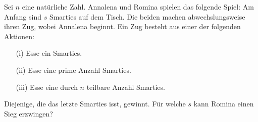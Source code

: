 Sei $n$ eine natürliche Zahl. Annalena und Romina spielen das folgende Spiel:
Am Anfang sind $s$ Smarties auf dem Tisch. Die beiden machen abwechslungsweise ihren Zug, wobei Annalena beginnt. Ein Zug besteht aus einer der folgenden Aktionen:
\begin{itemize}
\item[(i)] Esse ein Smarties.
\item[(ii)] Esse eine prime Anzahl Smarties.
\item[(iii)] Esse eine durch $n$ teilbare Anzahl Smarties.
\end{itemize}
Diejenige, die das letzte Smarties isst, gewinnt. Für welche $s$ kann Romina einen Sieg erzwingen?